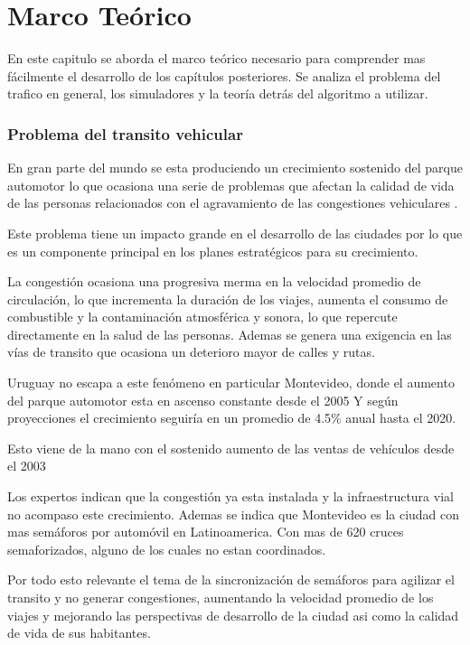 \chapter{Marco Teórico}

 En este capitulo se aborda el marco teórico necesario para comprender mas fácilmente el desarrollo de los capítulos posteriores. Se analiza el problema del trafico en general, los simuladores y la teoría detrás del algoritmo a utilizar.

\subsection{Problema del transito vehicular}

En gran parte del mundo se esta produciendo un crecimiento sostenido del parque automotor lo que ocasiona una serie de problemas que afectan la calidad de vida de las personas relacionados con el agravamiento de las congestiones vehiculares \citep{Cepal2003}.

Este problema tiene un impacto grande en el desarrollo de las ciudades por lo que es un componente principal en los planes estratégicos para su crecimiento.

La congestión ocasiona una progresiva merma en la velocidad promedio de circulación, lo que incrementa la duración de los viajes, aumenta el consumo de combustible y la contaminación atmosférica y sonora, lo que repercute directamente en la salud de las personas. 
Ademas se genera una exigencia en las vías de transito que ocasiona un deterioro mayor de calles y rutas.

Uruguay no escapa a este fenómeno en particular Montevideo, donde el aumento del parque automotor esta en ascenso constante desde el 2005 \citep{INE2014} 
Y según proyecciones el crecimiento seguiría en un promedio de 4.5\% anual hasta el 2020. \citep{BBVA2013}

Esto viene de la mano con el sostenido aumento de las ventas de vehículos  desde el 2003 \citep{Autoanuario2014}

Los expertos indican que la congestión ya esta instalada y la infraestructura vial no acompaso este crecimiento. Ademas se indica que Montevideo es la ciudad con mas semáforos por automóvil en Latinoamerica. Con mas de 620 cruces semaforizados, alguno de los cuales no estan coordinados.\citep{Subrayado2013}

Por todo esto relevante el tema de la sincronización de semáforos para agilizar el transito y no generar congestiones, aumentando la velocidad promedio de los viajes y mejorando las perspectivas de desarrollo de la ciudad asi como la calidad de vida de sus habitantes.

